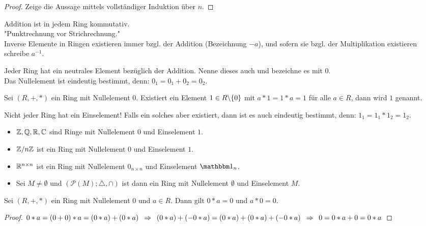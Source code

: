 \begin{proof}
	Zeige die Aussage mittels vollständiger Induktion über $n$.
\end{proof}
%
\begin{bem}
	Addition ist in jedem Ring kommutativ. \\
	"Punktrechnung vor Strichrechnung." \\
	Inverse Elemente in Ringen existieren immer bzgl. der Addition (Bezeichnung $-a$), und sofern sie bzgl. der Multiplikation existieren schreibe $a^{-1}$.
\end{bem}
%
\begin{bem}
	Jeder Ring hat ein neutrales Element bezüglich der Addition. Nenne dieses auch  und bezeichne es mit $0$. \\
	Das Nullelement ist eindeutig bestimmt, denn: $0_1 = 0_1 + 0_2 = 0_2$.
\end{bem}
%
\begin{defin}
	Sei $(R,+,*)$ ein Ring mit Nullelement $0$. Existiert ein Element $1 \in R \backslash \{ 0 \}$ mit $a*1 = 1*a = 1$ für alle $a \in R$, dann wird $1$  genannt.
\end{defin}
%
\begin{bem}
	Nicht jeder Ring hat ein Einselement! Falls ein solches aber existiert, dann ist es auch eindeutig bestimmt, denn: $1_1 = 1_1 * 1_2 = 1_2$.
\end{bem}
%
\begin{bsp}
	\begin{itemize}
		\item $\mathbb{Z}, \mathbb{Q}, \mathbb{R}, \mathbb{C}$ sind Ringe mit Nullelement $0$ und Einselement $1$.
		\item $\mathbb{Z} / n \mathbb{Z}$ ist ein Ring mit Nullelement $0$ und Einselement $1$.
		\item $\mathbb{R}^{n \times n}$ ist ein Ring mit Nullelement $0_{n \times n}$ und Einselement $\one_n$.
		\item Sei $M \neq \emptyset$ und $(\mathcal{P}(M); \triangle, \cap)$ ist dann ein Ring mit Nullelement $\emptyset$ und Einselement $M$.
	\end{itemize}
\end{bsp}
%
\begin{bem}
	Sei $(R,+,*)$ ein Ring mit Nullelement $0$ und $a \in R$. Dann gilt $0 * a = 0$ und $a * 0 = 0$.
\end{bem}
\begin{proof}
	$0*a = (0 + 0)*a = (0 * a) + (0 * a) \enspace \Rightarrow \enspace (0*a) + (-0*a) = (0*a) + (0*a) + (-0*a) \enspace \Rightarrow \enspace 0 = 0*a + 0 = 0*a$
\end{proof}
